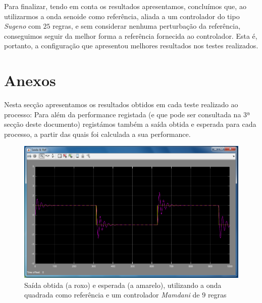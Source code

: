 \documentclass{article}
\begin{document}
Para finalizar, tendo em conta os resultados apresentamos, concluímos que, ao utilizarmos a onda senoide como referência, aliada a um controlador do tipo \emph{Sugeno} com $25$ regras, e sem considerar nenhuma perturbação da referência, conseguimos seguir da melhor forma a referência fornecida ao controlador. Esta é, portanto, a configuração que apresentou melhores resultados nos testes realizados.

\pagebreak

\section{Anexos}

Nesta secção apresentamos os resultados obtidos em cada teste realizado ao processo: Para além da performance registada (e que pode ser consultada na 3ª secção deste documento) registámos também a saída obtida e esperada para cada processo, a partir das quais foi calculada a sua performance.

\vspace{.2cm}


\begin{figure}[h]
  \centering
      \includegraphics[scale=0.3]{Images/Mamdani_9_square.png}
  \caption{Saída obtida (a roxo) e esperada (a amarelo), utilizando a onda quadrada como referência e um controlador \emph{Mamdani} de $9$ regras}
\end{figure}
\end{document}
